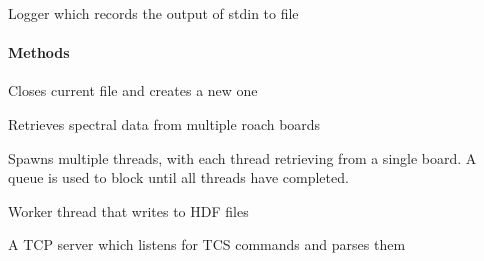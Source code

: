 \documentclass[letterpaper,10pt,english]{sphinxmanual}
\begin{document}

\begin{fulllineitems}
\label{software:hipsr_server.Logger}
Logger which records the output of stdin to file
\paragraph{Methods}

\end{fulllineitems}


\begin{fulllineitems}
\label{software:hipsr_server.createNewFile}
Closes current file and creates a new one

\end{fulllineitems}


\begin{fulllineitems}
\label{software:hipsr_server.getSpectraThreaded}
Retrieves spectral data from multiple roach boards

Spawns multiple threads, with each thread retrieving from a single board.
A queue is used to block until all threads have completed.

\end{fulllineitems}


\begin{fulllineitems}
\label{software:hipsr_server.hdfWriter}
Worker thread that writes to HDF files

\end{fulllineitems}


\begin{fulllineitems}
\label{software:hipsr_server.tcsServer}
A TCP server which listens for TCS commands and parses them

\end{fulllineitems}
\end{document}
